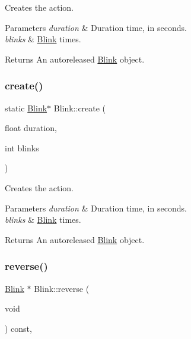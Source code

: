Creates the action. 
\begin{DoxyParams}{Parameters}
{\em duration} & Duration time, in seconds. \\
\hline
{\em blinks} & \hyperlink{classBlink}{Blink} times. \\
\hline
\end{DoxyParams}
\begin{DoxyReturn}{Returns}
An autoreleased \hyperlink{classBlink}{Blink} object. 
\end{DoxyReturn}
\mbox{\label{classBlink_a4369df860989ce2c3ffe8b535cfdae1c}} 
\subsubsection{\texorpdfstring{create()}{create()}\hspace{0.1cm}{\footnotesize\ttfamily [2/2]}}
{\footnotesize\ttfamily static \hyperlink{classBlink}{Blink}$\ast$ Blink\+::create (\begin{DoxyParamCaption}\item[{float}]{duration,  }\item[{int}]{blinks }\end{DoxyParamCaption})\hspace{0.3cm}{\ttfamily [static]}}

Creates the action. 
\begin{DoxyParams}{Parameters}
{\em duration} & Duration time, in seconds. \\
\hline
{\em blinks} & \hyperlink{classBlink}{Blink} times. \\
\hline
\end{DoxyParams}
\begin{DoxyReturn}{Returns}
An autoreleased \hyperlink{classBlink}{Blink} object. 
\end{DoxyReturn}
\mbox{\label{classBlink_a4e2631e42f7ef86f0fc5097e87f352c5}} 
\subsubsection{\texorpdfstring{reverse()}{reverse()}\hspace{0.1cm}{\footnotesize\ttfamily [1/2]}}
{\footnotesize\ttfamily \hyperlink{classBlink}{Blink} $\ast$ Blink\+::reverse (\begin{DoxyParamCaption}\item[{void}]{ }\end{DoxyParamCaption}) const\hspace{0.3cm}{\ttfamily [override]}, {\ttfamily [virtual]}}

